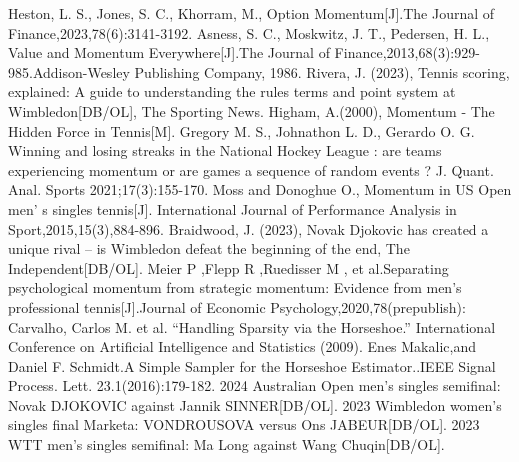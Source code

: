 \documentclass{mcmthesis}
\begin{document}
\newpage
\begin{thebibliography}{99}
 Heston, L. S., Jones, S. C., Khorram, M., Option Momentum[J].The Journal of Finance,2023,78(6):3141-3192.
 Asness, S. C., Moskwitz, J. T., Pedersen, H. L., Value and Momentum Everywhere[J].The Journal of Finance,2013,68(3):929-985.Addison-Wesley Publishing Company, 1986.
 Rivera, J. (2023), Tennis scoring, explained: A guide to understanding the rules terms and point system at Wimbledon[DB/OL], The Sporting News.
 Higham, A.(2000), Momentum - The Hidden Force in Tennis[M].
 Gregory M. S., Johnathon L. D., Gerardo O. G. Winning and losing streaks in the National Hockey League : are teams experiencing momentum or are games a sequence of random events ? J. Quant. Anal. Sports 2021;17(3):155-170.
 Moss and Donoghue O., Momentum in US Open men' s singles tennis[J]. International Journal of Performance Analysis in Sport,2015,15(3),884-896.
 Braidwood, J. (2023), Novak Djokovic has created a unique rival – is Wimbledon defeat the beginning of the end, The Independent[DB/OL].
 Meier P ,Flepp R ,Ruedisser M , et al.Separating psychological momentum from strategic momentum: Evidence from men’s professional tennis[J].Journal of Economic Psychology,2020,78(prepublish):
 Carvalho, Carlos M. et al. “Handling Sparsity via the Horseshoe.” International Conference on Artificial Intelligence and Statistics (2009).
 Enes Makalic,and Daniel F. Schmidt.A Simple Sampler for the Horseshoe Estimator..IEEE Signal Process. Lett. 23.1(2016):179-182.
 2024 Australian Open men's singles semifinal: Novak DJOKOVIC against Jannik SINNER[DB/OL].
 2023 Wimbledon women's singles final Marketa: VONDROUSOVA versus Ons JABEUR[DB/OL].
 2023 WTT men's singles semifinal: Ma Long against Wang Chuqin[DB/OL].
\end{thebibliography}
\end{document}
